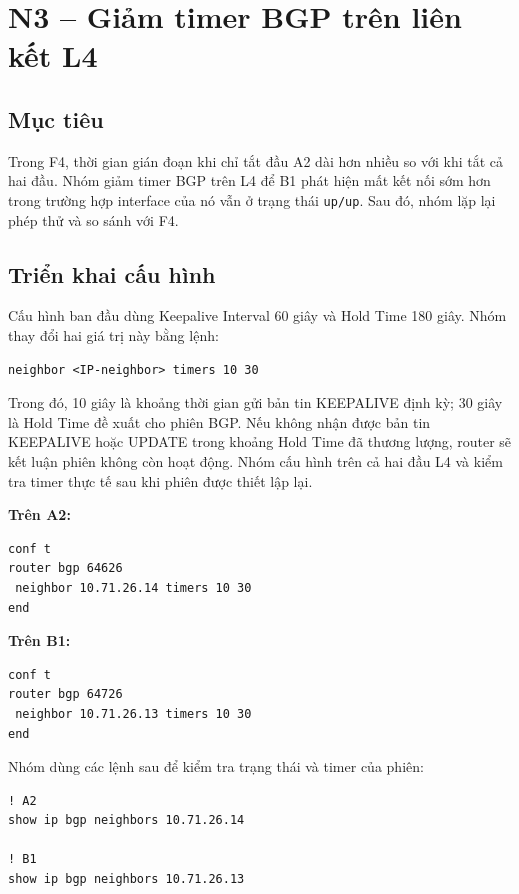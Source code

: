 
\section{N3 -- Giảm timer BGP trên liên kết L4}

\subsection{Mục tiêu}

Trong F4, thời gian gián đoạn khi chỉ tắt
đầu A2 dài hơn nhiều so với khi tắt cả hai đầu.
Nhóm giảm timer BGP trên L4 để B1
phát hiện mất kết nối sớm hơn trong trường hợp
interface của nó vẫn ở trạng thái \texttt{up/up}.
Sau đó, nhóm lặp lại phép thử và so sánh với F4.

\subsection{Triển khai cấu hình}

Cấu hình ban đầu dùng Keepalive Interval
60 giây và Hold Time 180 giây.
Nhóm thay đổi hai giá trị này bằng lệnh:

\begin{lstlisting}
neighbor <IP-neighbor> timers 10 30
\end{lstlisting}

Trong đó, 10 giây là khoảng thời gian
gửi bản tin KEEPALIVE định kỳ;
30 giây là Hold Time đề xuất cho phiên BGP.
Nếu không nhận được bản tin KEEPALIVE hoặc UPDATE
trong khoảng Hold Time đã thương lượng,
router sẽ kết luận phiên không còn hoạt động.
Nhóm cấu hình trên cả hai đầu L4
và kiểm tra timer thực tế sau khi
phiên được thiết lập lại.

\textbf{Trên A2:}

\begin{lstlisting}
conf t
router bgp 64626
 neighbor 10.71.26.14 timers 10 30
end
\end{lstlisting}

\textbf{Trên B1:}

\begin{lstlisting}
conf t
router bgp 64726
 neighbor 10.71.26.13 timers 10 30
end
\end{lstlisting}

Nhóm dùng các lệnh sau để kiểm tra
trạng thái và timer của phiên:

\begin{lstlisting}
! A2
show ip bgp neighbors 10.71.26.14

! B1
show ip bgp neighbors 10.71.26.13
\end{lstlisting}

